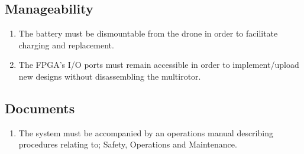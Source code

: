 \documentclass[10pt,letterpaper]{article}
\begin{document}
\subsection{Manageability}
\begin{enumerate}[label=C.MG.\arabic*, wide=1cm, widest=3cm, leftmargin=*, font=\bfseries, noitemsep,topsep=0pt, parsep=4pt, partopsep=0pt]
    \item The battery must be dismountable from the drone in order to facilitate charging and replacement.
    \item The FPGA's I/O ports must remain accessible in order to implement/upload new designs without disassembling the multirotor.
\end{enumerate}

\subsection{Documents}
\begin{enumerate}[label=C.DD.\arabic*, wide=1cm, widest=3cm, leftmargin=*, font=\bfseries, noitemsep,topsep=0pt, parsep=4pt, partopsep=0pt]
    \item  The system must be accompanied by an operations manual describing procedures relating to; Safety, Operations and Maintenance.
\end{enumerate}

\clearpage
{}



\end{document}
